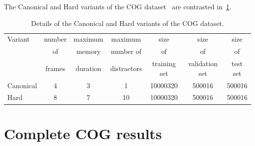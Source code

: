 \noindent The Canonical and Hard variants of the COG dataset~\cite{yang2018dataset} are contrasted in~\cref{tab:cog_variants_supplement}.
\begin{table}[ht]
	\centering
	\begin{tabular}{lcccccc}
		\toprule
		Variant    &  	number &  	maximum & maximum & size & size & size  \\
		& of   & memory & number of & of & of & of  \\
		& frames & duration & distractors & training set & validation set & test set \\
		\midrule
		Canonical & 4 & 3 & 1 & 10000320 & 500016 & 500016 \\
		Hard  & 8 & 7 & 10 & 10000320 & 500016  & 500016 \\
		\bottomrule
	\end{tabular}
	\smallskip
	\caption{Details of the Canonical and Hard variants of the COG dataset.}
	\label{tab:cog_variants_supplement}
\end{table}
%



\clearpage
\section{Complete COG results}
\label{sec:cog-all-results}

